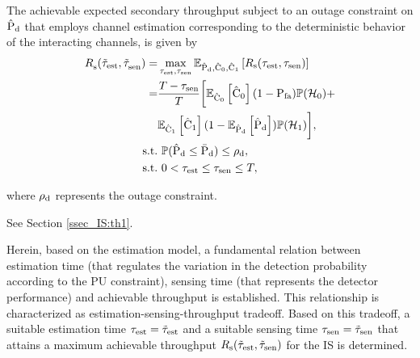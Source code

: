\begin{theorem} \label{th_IS:th2}
\normalfont
The achievable expected secondary throughput subject to an outage constraint on $\hat{\text{P}}_{\text{d}}$ that employs channel estimation corresponding to the deterministic behavior of the interacting channels, is given by  
\begin{align}
{R}_{\text{s}}^{\text{}}(\tilde{\tau}_{\text{est}}, \tilde{\tau}_{\text{sen}}^{\text{}}) =& \operatorname*{max}_{\tau_{\text{est}}, \tau_{\text{sen}}} {\mathbb E}_{\hat{\text{P}}_{\text{d}}, \hat{\text{C}}_{\text{0}}, \hat{\text{C}}_{\text{1}}}\left[ R_{\text{s}}(\tau_{\text{est}}, \tau_{\text{sen}}) \right] \nonumber \\ 
\quad =& \frac{T- \tau_{\text{sen}}}{T} \bigg[ {\mathbb E}_{\hat{\text{C}}_{\text{0}}}\left[ \hat{\text{C}}_{\text{0}} \right] (1 - \text{P}_{\text{fa}}) \mathbb P(\mathcal{H}_0) + \nonumber \\ \quad & {\mathbb E}_{\hat{\text{C}}_{\text{1}}}\left[ \hat{\text{C}}_{\text{1}} \right] (1 - {\mathbb E}_{\hat{\text{P}}_{\text{d}}}\left[ \hat{\text{P}}_{\text{d}} \right]) \mathbb P(\mathcal{H}_1)  \bigg], \label{eq_IS:thr_OC} \\
\text{s.t.} & \text{ }  \mathbb P(\hat{\text{P}}_{\text{d}} \le \bar{\text{P}}_{\text{d}}) \le \rho_{\text{d}}, \label{eq_IS:OC} \\
\text{s.t.} & \text{ }  0 < \tau_{\text{est}} \le \tau_{\text{sen}} \le T, \nonumber
\end{align}
\end{theorem} 
where $\rho_{\text{d}}$ represents the outage constraint. 

\begin{IEEEproof}[Solution] 
See Section \ref{ssec_IS:th1}.
\end{IEEEproof} 
\begin{remark} \label{rem_IS:rem1}
\normalfont
{} 
Herein, based on the estimation model, a fundamental relation between estimation time (that regulates the variation in the detection probability according to the PU constraint), sensing time (that represents the detector performance) and achievable throughput is established. This relationship is characterized as estimation-sensing-throughput tradeoff. Based on this tradeoff, a suitable estimation time $\tau_{\text{est}} = \tilde{\tau}_{\text{est}}$ and a suitable sensing time $\tau_{\text{sen}} = \tilde{\tau}_{\text{sen}}$ that attains a maximum achievable throughput $R_{\text{s}}(\tilde{\tau}_{\text{est}},\tilde{\tau}_{\text{sen}})$ for the IS is determined.  
\end{remark}

